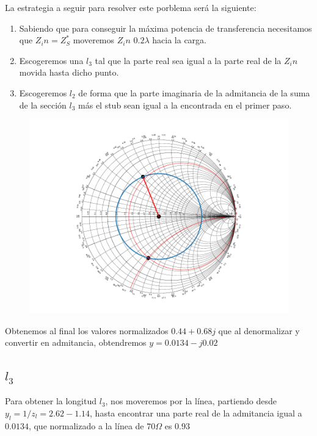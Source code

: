 
La estrategia a seguir para resolver este porblema será la siguiente:
\begin{enumerate}
  \item Sabiendo que para conseguir la máxima potencia de transferencia necesitamos que $Z_in = Z_S^*$ moveremos $Z_in$ $0.2\lambda$ hacia la carga.
  \item Escogeremos una $l_3$ tal que la parte real sea igual a la parte real de la $Z_in$ movida hasta dicho punto.
  \item Escogeremos $l_2$ de forma que la parte imaginaria de la admitancia de la suma de la sección $l_3$ más el stub sean igual a la encontrada en el primer paso.
\end{enumerate}

\begin{figure}[h]
  \centering
  \includegraphics[scale = 0.75]{ej11/images/out1.pdf}
  \label{ej2smith}
\end{figure}
Obtenemos al final los valores normalizados $0.44 + 0.68j$ que al denormalizar y convertir en admitancia, obtendremos $y = 0.0134 -j0.02$

\subsection{$l_3$}
Para obtener la longitud $l_3$, nos moveremos por la línea, partiendo desde $y_l = 1/z_l= 2.62 -1.14 $, hasta encontrar una parte real de la admitancia igual a $0.0134$, que normalizado a la línea de $70 \Omega$ es $0.93$

